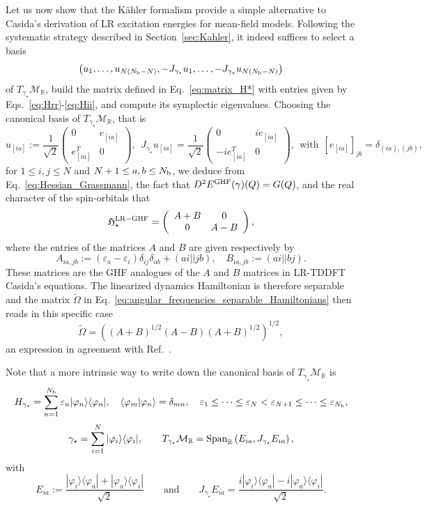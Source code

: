 \documentclass[11pt]{article}
\def\R{{\mathbb R}}
\begin{document}
Let us now show that the K\"ahler formalism provide a simple alternative to Casida's derivation of LR excitation energies for mean-field models. Following the systematic strategy described in Section~\ref{sec:Kahler}, it indeed suffices to select a basis 
$$\left(u_1,\ldots,u_{N(N_{\rm b}-N)},-J_{\gamma_\star} u_1,\ldots,-J_{\gamma_\star} u_{N(N_{\rm b}-N)}\right)$$ 
of $T_{\gamma_\star}\mathcal M_\R$, build the matrix defined in Eq.~\eqref{eq:matrix_H*} with entries given by Eqs.~\eqref{eq:Hrr}-\eqref{eq:Hii}, and compute its symplectic eigenvalues. Choosing the canonical basis of $T_{\gamma_\star}\mathcal M_\R$, that is
$$
u_{[ia]}:=\frac{1}{\sqrt{2}}\left( \begin{array}{cc} 0 & e_{[ia]} \\ e_{[ia]}^T & 0 \end{array} \right), ~~ J_{\gamma_\star} u_{[ia]}
=\frac{1}{\sqrt{2}}\left( \begin{array}{cc} 0 & i e_{[ia]} \\ -i e_{[ia]}^T & 0 \end{array} \right), ~~ \mbox{with} ~~ [e_{[ia]}]_{jb} = \delta_{(ia),(jb)},
$$
for $1\le i,j\le N$ and $N+1\le a,b\le N_{\rm b}$, we deduce from Eq.~\eqref{eq:Hessian_Grassmann}, the fact that $D^2E^{\rm GHF}(\gamma)(Q) = G(Q)$, and the real character of the spin-orbitals that 
\begin{equation}
\mathfrak H_{\star}^{\rm LR-GHF} =  \left( \begin{array}{cc} A+B & 0 \\ 0 & A-B \end{array} \right), \label{eqn:H_symplectic}
\end{equation}
where the entries of the matrices $A$ and $B$ are given respectively by
$$
A_{ia,jb}:=(\varepsilon_a-\varepsilon_i)\delta_{ij}\delta_{ab}+ (ai||jb),\quad B_{ia,jb}:=(ai||bj).
$$
These matrices are the GHF analogues of the $A$ and $B$ matrices in LR-TDDFT Casida's equations. The linearized dynamics Hamiltonian is therefore separable and the matrix $\widetilde \Omega$ in Eq.~\eqref{eq:angular_frequencies_separable_Hamiltonians} then reads in this specific case
$$
\widetilde\Omega= \left((A+B)^{1/2}(A-B)(A+B)^{1/2} \right)^{1/2},
$$
an expression in agreement with Ref.~\cite[Eqs. (II.78)-(II.79)]{CASIDA20093}.

\medskip

Note that a more intrinsic way to write down the canonical basis of $T_{\gamma_\star}\mathcal M_\R$ is 
$$
H_{\gamma_\star}=\sum_{n=1}^{N_{\rm b}} \varepsilon_n |\varphi_n\rangle\langle\varphi_n|, \quad \langle\varphi_m|\varphi_n\rangle=\delta_{mn}, \quad \varepsilon_1 \le \cdots \le  \varepsilon_N < \varepsilon_{N+1} \le \cdots \le \varepsilon_{N_{\rm b}},
$$
$$
\gamma_\star= \sum_{i=1}^N |\varphi_i\rangle\langle\varphi_i|, \qquad T_{\gamma_\star}\mathcal M_\R = {\rm Span}_\R\left( E_{ia}, J_{\gamma_\star} E_{ia} \right),
$$
with
$$
 E_{ia}:=\frac{|\varphi_i\rangle\langle\varphi_a| + |\varphi_a\rangle\langle\varphi_i| }{\sqrt 2} \qquad \mbox{and} \qquad J_{\gamma_\star}E_{ia} = \frac{i |\varphi_i\rangle\langle\varphi_a| -i  |\varphi_a\rangle\langle\varphi_i| }{\sqrt 2}. 
$$
\end{document}
